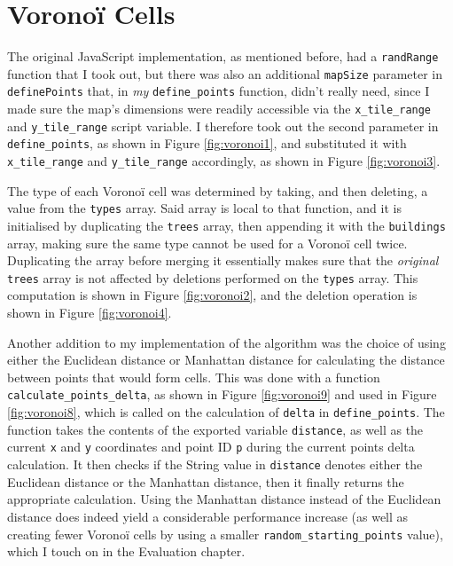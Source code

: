 \section{Voronoï Cells}

The original JavaScript implementation, as mentioned before, had a \verb|randRange| function that I took out, but there was also an additional \verb|mapSize| parameter in \verb|definePoints| that, in \textit{my} \verb|define_points| function, didn't really need, since I made sure the map's dimensions were readily accessible via the \verb|x_tile_range| and \verb|y_tile_range| script variable. I therefore took out the second parameter in \verb|define_points|, as shown in Figure \ref{fig:voronoi1}, and substituted it with \verb|x_tile_range| and \verb|y_tile_range| accordingly, as shown in Figure \ref{fig:voronoi3}.

The type of each Voronoï cell was determined by taking, and then deleting, a value from the \verb|types| array. Said array is local to that function, and it is initialised by duplicating the \verb|trees| array, then appending it with the \verb|buildings| array, making sure the same type cannot be used for a Voronoï cell twice. Duplicating the array before merging it essentially makes sure that the \textit{original} \verb|trees| array is not affected by deletions performed on the \verb|types| array. This computation is shown in Figure \ref{fig:voronoi2}, and the deletion operation is shown in Figure \ref{fig:voronoi4}.

Another addition to my implementation of the algorithm was the choice of using either the Euclidean distance or Manhattan distance for calculating the distance between points that would form cells. This was done with a function \verb|calculate_points_delta|, as shown in Figure \ref{fig:voronoi9} and used in Figure \ref{fig:voronoi8}, which is called on the calculation of \verb|delta| in \verb|define_points|. The function takes the contents of the exported variable \verb|distance|, as well as the current \verb|x| and \verb|y| coordinates and point ID \verb|p| during the current points delta calculation. It then checks if the String value in \verb|distance| denotes either the Euclidean distance or the Manhattan distance, then it finally returns the appropriate calculation. Using the Manhattan distance instead of the Euclidean distance does indeed yield a considerable performance increase (as well as creating fewer Voronoï cells by using a smaller \verb|random_starting_points| value), which I touch on in the Evaluation chapter.

